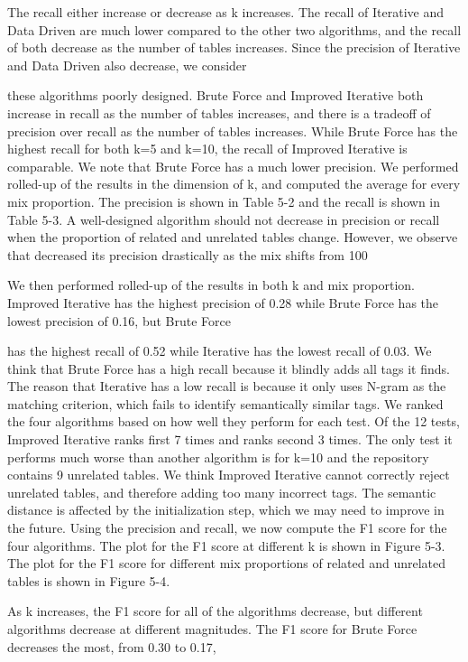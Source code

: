 The recall either increase or decrease as k increases. The recall of Iterative and Data Driven are much lower compared to the other two algorithms, and the recall of both decrease as the number of tables increases. Since the precision of Iterative and Data Driven also decrease, we consider

these algorithms poorly designed. Brute Force and Improved Iterative both increase in recall as the number of tables increases, and there is a tradeoff of precision over recall as the number of tables increases. While Brute Force has the highest recall for both k=5 and k=10, the recall of Improved Iterative is comparable. We note that Brute Force has a much lower precision.
We performed rolled-up of the results in the dimension of k, and computed the average for every mix proportion. The precision is shown in Table 5-2 and the recall is shown in Table 5-3. A well-designed algorithm should not decrease in precision or recall when the proportion of related and unrelated tables change. However, we observe that decreased its precision drastically as the mix shifts from 100%

We then performed rolled-up of the results in both k and mix proportion. Improved Iterative has the highest precision of 0.28 while Brute Force has the lowest precision of 0.16, but Brute Force

has the highest recall of 0.52 while Iterative has the lowest recall of 0.03. We think that Brute Force has a high recall because it blindly adds all tags it finds. The reason that Iterative has a low recall is because it only uses N-gram as the matching criterion, which fails to identify semantically similar tags.
We ranked the four algorithms based on how well they perform for each test. Of the 12 tests, Improved Iterative ranks first 7 times and ranks second 3 times. The only test it performs much worse than another algorithm is for k=10 and the repository contains 9 unrelated tables. We think Improved Iterative cannot correctly reject unrelated tables, and therefore adding too many incorrect tags. The semantic distance is affected by the initialization step, which we may need to improve in the future.
Using the precision and recall, we now compute the F1 score for the four algorithms. The plot for the F1 score at different k is shown in Figure 5-3. The plot for the F1 score for different mix proportions of related and unrelated tables is shown in Figure 5-4.

As k increases, the F1 score for all of the algorithms decrease, but different algorithms decrease at different magnitudes. The F1 score for Brute Force decreases the most, from 0.30 to 0.17,

